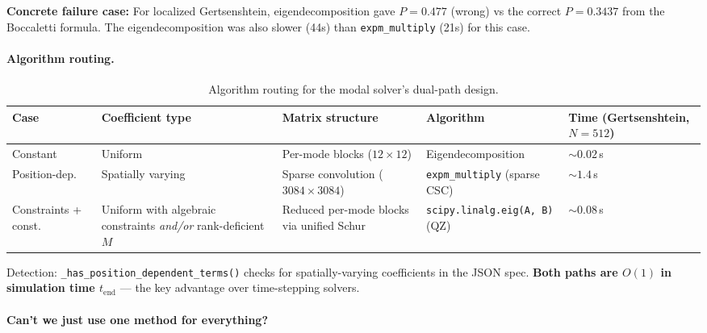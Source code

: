 \textbf{Concrete failure case:} For localized Gertsenshtein, eigendecomposition gave $P = 0.477$ (wrong) vs the correct $P = 0.3437$ from the Boccaletti formula. The eigendecomposition was also slower (44s) than \texttt{expm\_multiply} (21s) for this case.

\paragraph{Algorithm routing.}
\label{par:modal-routing}

\begin{table}[htbp]
\centering
\caption{Algorithm routing for the modal solver's dual-path design.}
\label{tab:modal-routing}
\begin{tabular}{@{}lllll@{}}
\toprule
Case & Coefficient type & Matrix structure & Algorithm & Time (Gertsenshtein, $N=512$) \\
\midrule
Constant & Uniform & Per-mode blocks ($12\times 12$) & Eigendecomposition & ${\sim}0.02$\,s \\
Position-dep. & Spatially varying & Sparse convolution ($3084\times 3084$) & \texttt{expm\_multiply} (sparse CSC) & ${\sim}1.4$\,s \\
Constraints + const. & Uniform with algebraic constraints \emph{and/or} rank-deficient $M$ & Reduced per-mode blocks via unified Schur & \texttt{scipy.linalg.eig(A, B)} (QZ) & ${\sim}0.08$\,s \\
\bottomrule
\end{tabular}
\end{table}

Detection: \texttt{\_has\_position\_dependent\_terms()} checks for spatially-varying coefficients in the JSON spec. \textbf{Both paths are $O(1)$ in simulation time $t_\text{end}$} --- the key advantage over time-stepping solvers.

\paragraph{Can't we just use one method for everything?}
\label{par:modal-one-method}

